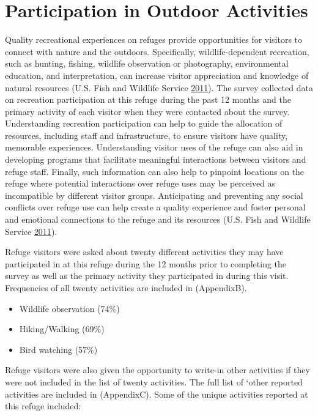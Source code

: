 \documentclass[]{book}
\providecommand{\tightlist}{%
  \setlength{\itemsep}{0pt}\setlength{\parskip}{0pt}}
\let\BeginKnitrBlock\begin \let\EndKnitrBlock\end
\begin{document}
\section{Participation in Outdoor
Activities}\label{participation-in-outdoor-activities}

\BeginKnitrBlock{preamble1}
Quality recreational experiences on refuges provide opportunities for
visitors to connect with nature and the outdoors. Specifically,
wildlife-dependent recreation, such as hunting, fishing, wildlife
observation or photography, environmental education, and interpretation,
can increase visitor appreciation and knowledge of natural resources
(U.S. Fish and Wildlife Service
\protect\hyperlink{ref-USFWS2011}{2011}). The survey collected data on
recreation participation at this refuge during the past 12 months and
the primary activity of each visitor when they were contacted about the
survey. Understanding recreation participation can help to guide the
allocation of resources, including staff and infrastructure, to ensure
visitors have quality, memorable experiences. Understanding visitor uses
of the refuge can also aid in developing programs that facilitate
meaningful interactions between visitors and refuge staff. Finally, such
information can also help to pinpoint locations on the refuge where
potential interactions over refuge uses may be perceived as incompatible
by different visitor groups. Anticipating and preventing any social
conflicts over refuge use can help create a quality experience and
foster personal and emotional connections to the refuge and its
resources (U.S. Fish and Wildlife Service
\protect\hyperlink{ref-USFWS2011}{2011}).
\EndKnitrBlock{preamble1}

Refuge visitors were asked about twenty different activities they may
have participated in at this refuge during the 12 months prior to
completing the survey as well as the primary activity they participated
in during this visit. Frequencies of all twenty activities are included
in (AppendixB).

\begin{itemize}
\tightlist
\item
  Wildlife observation (74\%)
\item
  Hiking/Walking (69\%)
\item
  Bird watching (57\%)
\end{itemize}

Refuge visitors were also given the opportunity to write-in other
activities if they were not included in the list of twenty activities.
The full list of `other reported activities are included in (AppendixC).
Some of the unique activities reported at this refuge included:
\end{document}
